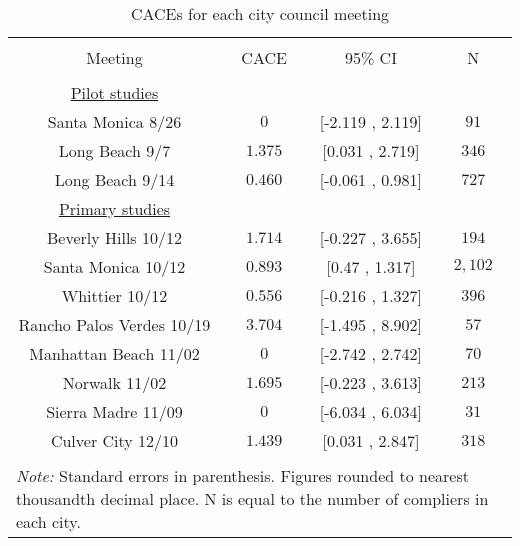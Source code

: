 
\begin{table}[!htbp] \centering 
  \caption{CACEs for each city council meeting} 
  \label{city_cace} 
\begin{tabular}{@{\extracolsep{30pt}} cccc} 
\\[-1.8ex]\hline 
\hline \\[-1.8ex] 
Meeting & CACE & 95\% CI & N \\ 
\hline \\[-1.8ex] 
\underline{Pilot studies} & & & \\
Santa Monica 8/26 & $0$ & [-2.119 , 2.119] & $91$ \\ 
Long Beach 9/7 & $1.375$ & [0.031 , 2.719] & $346$ \\ 
Long Beach 9/14 & $0.460$ & [-0.061 , 0.981] & $727$ \\ 
\underline{Primary studies} & & & \\
Beverly Hills 10/12 & $1.714$ & [-0.227 , 3.655] & $194$ \\ 
Santa Monica 10/12 & $0.893$ & [0.47 , 1.317] & $2,102$ \\ 
Whittier 10/12 & $0.556$ & [-0.216 , 1.327] & $396$ \\ 
Rancho Palos Verdes 10/19 & $3.704$ & [-1.495 , 8.902] & $57$ \\ 
Manhattan Beach 11/02 & $0$ & [-2.742 , 2.742] & $70$ \\ 
Norwalk 11/02 & $1.695$ & [-0.223 , 3.613] & $213$ \\ 
Sierra Madre 11/09 & $0$ & [-6.034 , 6.034] & $31$ \\ 
Culver City 12/10 & $1.439$ & [0.031 , 2.847] & $318$ \\ 
\hline \\[-1.8ex] 
\multicolumn{4}{l}{\parbox[t]{\textwidth}{\footnotesize \textit{Note:} Standard errors in parenthesis. Figures rounded to nearest thousandth decimal place. N is equal to the number of compliers in each city.}} \\ 
\end{tabular} 
\end{table} 
